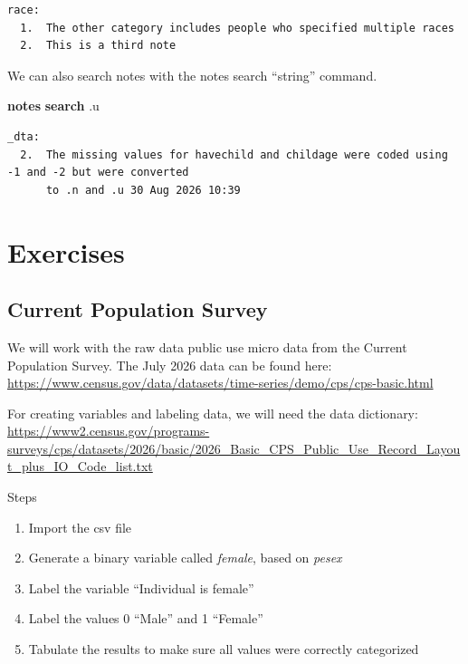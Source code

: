 \documentclass[
]{book}
\newenvironment{Shaded}{\begin{snugshade}}{\end{snugshade}}
\newcommand{\KeywordTok}[1]{\textcolor[rgb]{0.13,0.29,0.53}{\textbf{#1}}}
\newcommand{\NormalTok}[1]{#1}
\providecommand{\tightlist}{%
  \setlength{\itemsep}{0pt}\setlength{\parskip}{0pt}}
\begin{document}
\begin{verbatim}
race:
  1.  The other category includes people who specified multiple races
  2.  This is a third note
\end{verbatim}

We can also search notes with the notes search ``string'' command.

\begin{Shaded}
\begin{Highlighting}[]
\KeywordTok{notes} \KeywordTok{search}\NormalTok{ .u}
\end{Highlighting}
\end{Shaded}

\begin{verbatim}
_dta:
  2.  The missing values for havechild and childage were coded using -1 and -2 but were converted
      to .n and .u 30 Aug 2026 10:39
\end{verbatim}

\chapter{Exercises}\label{exercises}

\section{Current Population Survey}\label{current-population-survey}

We will work with the raw data public use micro data from the Current Population Survey. The July 2026 data can be found here: \url{https://www.census.gov/data/datasets/time-series/demo/cps/cps-basic.html}

For creating variables and labeling data, we will need the data dictionary: \url{https://www2.census.gov/programs-surveys/cps/datasets/2026/basic/2026_Basic_CPS_Public_Use_Record_Layout_plus_IO_Code_list.txt}

Steps

\begin{enumerate}
\def\labelenumi{\arabic{enumi}.}
\tightlist
\item
  Import the csv file
\item
  Generate a binary variable called \emph{female}, based on \emph{pesex}
\item
  Label the variable ``Individual is female''
\item
  Label the values 0 ``Male'' and 1 ``Female''
\item
  Tabulate the results to make sure all values were correctly categorized
\end{enumerate}
\end{document}

